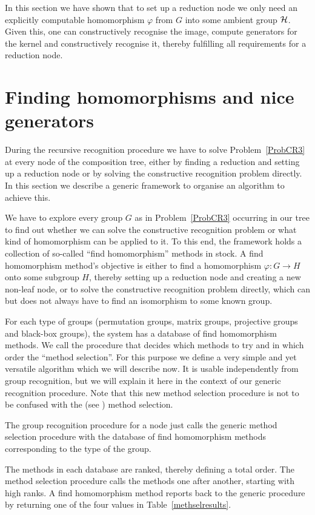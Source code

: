 In this section we have shown that to set up a reduction node we only need
an explicitly computable homomorphism $\varphi$ from $G$ into some
ambient group $\mathcal{H}$. Given this, one can constructively recognise the
image, compute generators for the kernel and constructively recognise it,
thereby fulfilling all requirements for a reduction node.


\section{Finding homomorphisms and nice generators}
\label{findhom}

During the recursive recognition procedure we have to solve
Problem~\ref{ProbCR3} at every node of the composition tree, either
by finding a reduction and setting up a reduction node or by solving 
the constructive recognition problem directly. In this section we describe
a generic framework to organise an algorithm to achieve this.

We have to explore every group $G$ as in Problem~\ref{ProbCR3} 
occurring in our tree to find out whether we 
can solve the constructive recognition 
problem or what kind of homomorphism can be 
applied to it. To this end, the framework holds a collection
of so-called ``find homomorphism'' methods in stock. A find homomorphism
method's objective is either to find a homomorphism $\varphi: G \to H$
onto some subgroup $H$, thereby setting up a reduction node and 
creating a new non-leaf node, or to
solve the constructive recognition 
problem directly, which can but does not always have to find
an isomorphism to some known group.

For each type of groups (permutation groups, matrix groups, projective
groups and black-box
groups), the system has a database of find homomorphism methods.
We call the procedure that decides which methods to try and in which order 
the ``method selection''. For this purpose we define a very simple and yet 
versatile algorithm which we will describe now. It is usable independently
from group recognition, but we will explain it here in the context of
our generic recognition procedure. Note that this new method selection
procedure is not to be confused with the {\GAP} (see \cite{GAP4}) method
selection. 

The group recognition procedure for a node just calls the generic method
selection procedure with the database of find homomorphism methods
corresponding to the type of the group.

The methods in each database are ranked, thereby defining a total
order. The method selection procedure calls the methods one after another,
starting with high ranks. A find homomorphism method reports back to
the generic procedure by returning one of the four values in
Table~\ref{methselresults}.

